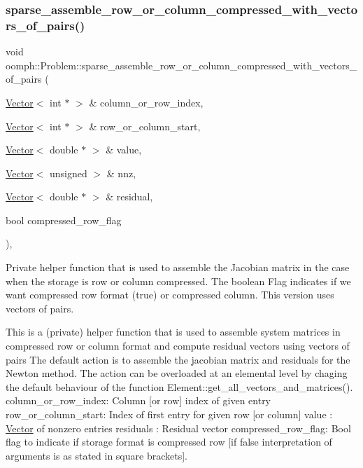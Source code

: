 \subsubsection{\texorpdfstring{sparse\+\_\+assemble\+\_\+row\+\_\+or\+\_\+column\+\_\+compressed\+\_\+with\+\_\+vectors\+\_\+of\+\_\+pairs()}{sparse\_assemble\_row\_or\_column\_compressed\_with\_vectors\_of\_pairs()}}
{\footnotesize\ttfamily void oomph\+::\+Problem\+::sparse\+\_\+assemble\+\_\+row\+\_\+or\+\_\+column\+\_\+compressed\+\_\+with\+\_\+vectors\+\_\+of\+\_\+pairs (\begin{DoxyParamCaption}\item[{\hyperlink{classoomph_1_1Vector}{Vector}$<$ int $\ast$ $>$ \&}]{column\+\_\+or\+\_\+row\+\_\+index,  }\item[{\hyperlink{classoomph_1_1Vector}{Vector}$<$ int $\ast$ $>$ \&}]{row\+\_\+or\+\_\+column\+\_\+start,  }\item[{\hyperlink{classoomph_1_1Vector}{Vector}$<$ double $\ast$ $>$ \&}]{value,  }\item[{\hyperlink{classoomph_1_1Vector}{Vector}$<$ unsigned $>$ \&}]{nnz,  }\item[{\hyperlink{classoomph_1_1Vector}{Vector}$<$ double $\ast$ $>$ \&}]{residual,  }\item[{bool}]{compressed\+\_\+row\+\_\+flag }\end{DoxyParamCaption})\hspace{0.3cm}{\ttfamily [private]}, {\ttfamily [virtual]}}



Private helper function that is used to assemble the Jacobian matrix in the case when the storage is row or column compressed. The boolean Flag indicates if we want compressed row format (true) or compressed column. This version uses vectors of pairs. 

This is a (private) helper function that is used to assemble system matrices in compressed row or column format and compute residual vectors using vectors of pairs The default action is to assemble the jacobian matrix and residuals for the Newton method. The action can be overloaded at an elemental level by chaging the default behaviour of the function Element\+::get\+\_\+all\+\_\+vectors\+\_\+and\+\_\+matrices(). column\+\_\+or\+\_\+row\+\_\+index\+: Column \mbox{[}or row\mbox{]} index of given entry row\+\_\+or\+\_\+column\+\_\+start\+: Index of first entry for given row \mbox{[}or column\mbox{]} value \+: \hyperlink{classoomph_1_1Vector}{Vector} of nonzero entries residuals \+: Residual vector compressed\+\_\+row\+\_\+flag\+: Bool flag to indicate if storage format is compressed row \mbox{[}if false interpretation of arguments is as stated in square brackets\mbox{]}. 

